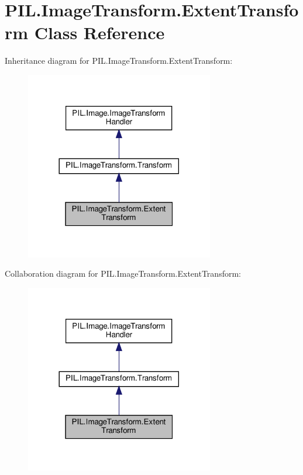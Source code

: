 \hypertarget{classPIL_1_1ImageTransform_1_1ExtentTransform}{}\section{P\+I\+L.\+Image\+Transform.\+Extent\+Transform Class Reference}
\label{classPIL_1_1ImageTransform_1_1ExtentTransform}


Inheritance diagram for P\+I\+L.\+Image\+Transform.\+Extent\+Transform\+:
\nopagebreak
\begin{figure}[H]
\begin{center}
\leavevmode
\includegraphics[width=233pt]{classPIL_1_1ImageTransform_1_1ExtentTransform__inherit__graph}
\end{center}
\end{figure}


Collaboration diagram for P\+I\+L.\+Image\+Transform.\+Extent\+Transform\+:
\nopagebreak
\begin{figure}[H]
\begin{center}
\leavevmode
\includegraphics[width=233pt]{classPIL_1_1ImageTransform_1_1ExtentTransform__coll__graph}
\end{center}
\end{figure}
